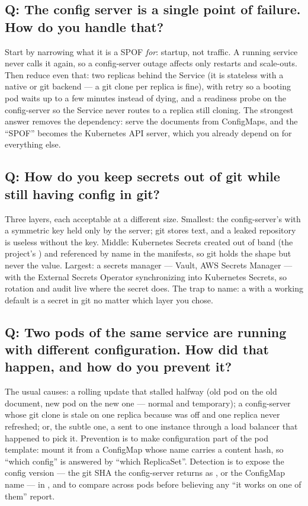 \subsection*{Q: The config server is a single point of failure. How do
you handle that?}

Start by narrowing what it is a SPOF \emph{for}: startup, not traffic.
A running service never calls it again, so a config-server outage
affects only restarts and scale-outs. Then reduce even that: two
replicas behind the Service (it is stateless with a native or git
backend --- a git clone per replica is fine),  with
retry so a booting pod waits up to a few minutes instead of dying, and
a readiness probe on the config-server so the Service never routes to
a replica still cloning. The strongest answer removes the dependency:
serve the documents from ConfigMaps, and the ``SPOF'' becomes the
Kubernetes API server, which you already depend on for everything else.

\subsection*{Q: How do you keep secrets out of git while still having
config in git?}

Three layers, each acceptable at a different size. Smallest: the
config-server's  with a symmetric key held only by the
server; git stores  text, and a leaked repository is
useless without the key. Middle: Kubernetes Secrets created out of band
(the project's ) and referenced by name in the
manifests, so git holds the shape but never the value. Largest: a
secrets manager --- Vault, AWS Secrets Manager --- with the External
Secrets Operator synchronizing into Kubernetes Secrets, so rotation and
audit live where the secret does. The trap to name: a
 with a working default is a secret in git no
matter which layer you chose.

\subsection*{Q: Two pods of the same service are running with different
configuration. How did that happen, and how do you prevent it?}

The usual causes: a rolling update that stalled halfway (old pod on the
old document, new pod on the new one --- normal and temporary); a
config-server whose git clone is stale on one replica because
 was off and one replica never refreshed; or, the
subtle one, a  sent to one instance through a
load balancer that happened to pick it. Prevention is to make
configuration part of the pod template: mount it from a ConfigMap
whose name carries a content hash, so ``which config'' is answered by
``which ReplicaSet''. Detection is to expose the config version ---
the git SHA the config-server returns as , or the
ConfigMap name --- in , and to compare across
pods before believing any ``it works on one of them'' report.

